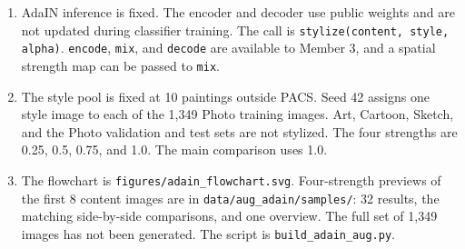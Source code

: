 \documentclass[a4paper]{article}
\begin{document}
\begin{enumerate}
  \item AdaIN inference is fixed. The encoder and decoder use public weights and are not updated during classifier training. The call is \texttt{stylize(content, style, alpha)}. \texttt{encode}, \texttt{mix}, and \texttt{decode} are available to Member 3, and a spatial strength map can be passed to \texttt{mix}.
  \item The style pool is fixed at 10 paintings outside PACS. Seed 42 assigns one style image to each of the 1,349 Photo training images. Art, Cartoon, Sketch, and the Photo validation and test sets are not stylized. The four strengths are 0.25, 0.5, 0.75, and 1.0. The main comparison uses 1.0.
  \item The flowchart is \texttt{figures/adain\_flowchart.svg}. Four-strength previews of the first 8 content images are in \texttt{data/aug\_adain/samples/}: 32 results, the matching side-by-side comparisons, and one overview. The full set of 1,349 images has not been generated. The script is \texttt{build\_adain\_aug.py}.
\end{enumerate}



\end{document}
